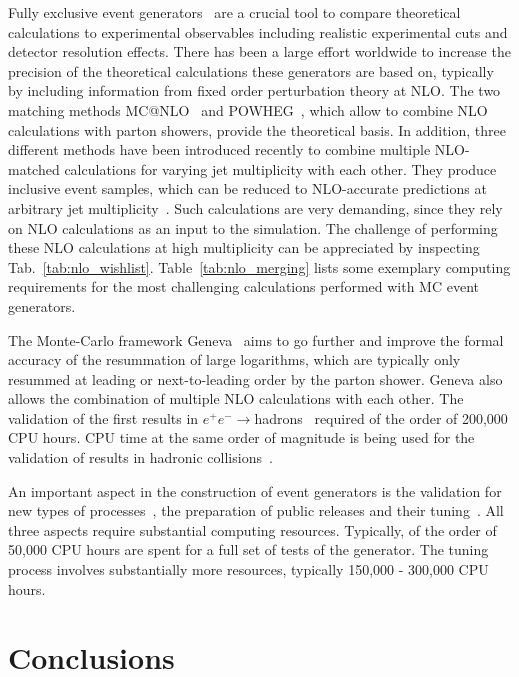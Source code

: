 \documentclass[12pt]{article}
\begin{document}
Fully exclusive event generators~\cite{Buckley:2011ms} are a crucial tool 
to compare theoretical calculations to experimental observables including
realistic experimental cuts and detector resolution effects. 
There has been a large effort worldwide to increase the precision 
of the theoretical calculations these generators are based on, 
typically by including information from fixed order perturbation theory 
at NLO. The two matching methods MC@NLO~\cite{Frixione:2002ik} and 
POWHEG~\cite{Nason:2004rx}, which allow to combine NLO calculations with
parton showers, provide the theoretical basis. In addition, three different 
methods have been introduced recently to combine multiple NLO-matched 
calculations for varying jet multiplicity with each other.
They produce inclusive event samples, which can be reduced to NLO-accurate 
predictions at arbitrary jet multiplicity~\cite{Hoeche:2012yf,Lonnblad:2012ix,Frederix:2012ps}.
Such calculations are very demanding, since they rely on NLO calculations 
as an input to the simulation. The challenge of performing these NLO
calculations at high multiplicity can be appreciated by inspecting
Tab.~\ref{tab:nlo_wishlist}. Table~\ref{tab:nlo_merging} lists some 
exemplary computing requirements for the most challenging calculations
performed with MC event generators.

The Monte-Carlo framework Geneva~\cite{Alioli:2012fc} aims to go further 
and improve the formal accuracy of the resummation of large logarithms, 
which are typically only resummed at leading or next-to-leading order 
by the parton shower. Geneva also allows the combination of multiple 
NLO calculations with each other. The validation of the first results in 
$e^+ e^-\to$hadrons~\cite{Alioli:2012fc} required of the order of 200,000 
CPU hours. CPU time at the same order of magnitude is being used for the
validation of results in hadronic collisions~\cite{Alioli:2013vza}.

An important aspect in the construction of event generators is the validation
for new types of processes~\cite{Buckley:2010ar}, the preparation of 
public releases and their tuning~\cite{Buckley:2009bj}. 
All three aspects require substantial computing resources. Typically,
of the order of 50,000 CPU hours are spent for a full set of tests of the 
generator. The tuning process involves substantially more resources, typically
150,000 - 300,000 CPU hours.


\section{Conclusions}
\label{sec:summary}
\end{document}
